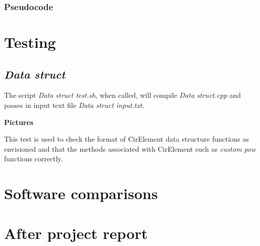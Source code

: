 \documentclass[12pt,a4paper]{article}
\begin{document}
\subsubsection{Pseudocode}
\pagebreak

\section{Testing}
\subsection{\textit{Data struct}}
The script \textit{Data struct test.sh}, when called, will compile \textit{Data struct.cpp} and passes in input 
text file \textit{Data struct input.txt}. 
\par
\textbf{Pictures}
\par
This test is used to check the format of CirElement data structure functions as envisioned and that the methods associated with
CirElement such as \textit{custom pow} functions correctly.
\pagebreak

\section{Software comparisons}
\pagebreak

\section{After project report}
\pagebreak

\printbibliography[title={References}]
\end{document}

